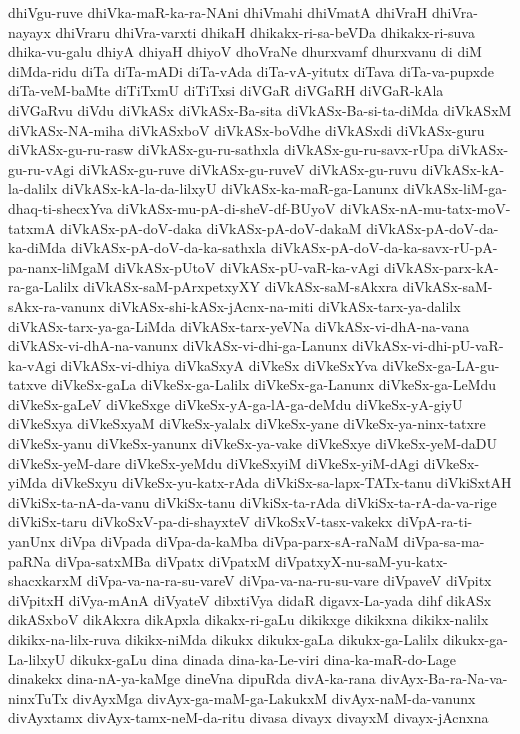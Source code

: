 {dhiVgu-ruve
dhiVka-maR-ka-ra-NAni
dhiVmahi
dhiVmatA
dhiVraH
dhiVra-nayayx
dhiVraru
dhiVra-varxti
dhikaH
dhikakx-ri-sa-beVDa
dhikakx-ri-suva
dhika-vu-galu
dhiyA
dhiyaH
dhiyoV
dhoVraNe
dhurxvamf
dhurxvanu
di
diM
diMda-ridu
diTa
diTa-mADi
diTa-vAda
diTa-vA-yitutx
diTava
diTa-va-pupxde
diTa-veM-baMte
diTiTxmU
diTiTxsi
diVGaR
diVGaRH
diVGaR-kAla
diVGaRvu
diVdu
diVkASx
diVkASx-Ba-sita
diVkASx-Ba-si-ta-diMda
diVkASxM
diVkASx-NA-miha
diVkASxboV
diVkASx-boVdhe
diVkASxdi
diVkASx-guru
diVkASx-gu-ru-rasw
diVkASx-gu-ru-sathxla
diVkASx-gu-ru-savx-rUpa
diVkASx-gu-ru-vAgi
diVkASx-gu-ruve
diVkASx-gu-ruveV
diVkASx-gu-ruvu
diVkASx-kA-la-dalilx
diVkASx-kA-la-da-lilxyU
diVkASx-ka-maR-ga-Lanunx
diVkASx-liM-ga-dhaq-ti-shecxYva
diVkASx-mu-pA-di-sheV-df-BUyoV
diVkASx-nA-mu-tatx-moV-tatxmA
diVkASx-pA-doV-daka
diVkASx-pA-doV-dakaM
diVkASx-pA-doV-da-ka-diMda
diVkASx-pA-doV-da-ka-sathxla
diVkASx-pA-doV-da-ka-savx-rU-pA-pa-nanx-liMgaM
diVkASx-pUtoV
diVkASx-pU-vaR-ka-vAgi
diVkASx-parx-kA-ra-ga-Lalilx
diVkASx-saM-pArxpetxyXY
diVkASx-saM-sAkxra
diVkASx-saM-sAkx-ra-vanunx
diVkASx-shi-kASx-jAcnx-na-miti
diVkASx-tarx-ya-dalilx
diVkASx-tarx-ya-ga-LiMda
diVkASx-tarx-yeVNa
diVkASx-vi-dhA-na-vana
diVkASx-vi-dhA-na-vanunx
diVkASx-vi-dhi-ga-Lanunx
diVkASx-vi-dhi-pU-vaR-ka-vAgi
diVkASx-vi-dhiya
diVkaSxyA
diVkeSx
diVkeSxYva
diVkeSx-ga-LA-gu-tatxve
diVkeSx-gaLa
diVkeSx-ga-Lalilx
diVkeSx-ga-Lanunx
diVkeSx-ga-LeMdu
diVkeSx-gaLeV
diVkeSxge
diVkeSx-yA-ga-lA-ga-deMdu
diVkeSx-yA-giyU
diVkeSxya
diVkeSxyaM
diVkeSx-yalalx
diVkeSx-yane
diVkeSx-ya-ninx-tatxre
diVkeSx-yanu
diVkeSx-yanunx
diVkeSx-ya-vake
diVkeSxye
diVkeSx-yeM-daDU
diVkeSx-yeM-dare
diVkeSx-yeMdu
diVkeSxyiM
diVkeSx-yiM-dAgi
diVkeSx-yiMda
diVkeSxyu
diVkeSx-yu-katx-rAda
diVkiSx-sa-lapx-TATx-tanu
diVkiSxtAH
diVkiSx-ta-nA-da-vanu
diVkiSx-tanu
diVkiSx-ta-rAda
diVkiSx-ta-rA-da-va-rige
diVkiSx-taru
diVkoSxV-pa-di-shayxteV
diVkoSxV-tasx-vakekx
diVpA-ra-ti-yanUnx
diVpa
diVpada
diVpa-da-kaMba
diVpa-parx-sA-raNaM
diVpa-sa-ma-paRNa
diVpa-satxMBa
diVpatx
diVpatxM
diVpatxyX-nu-saM-yu-katx-shacxkarxM
diVpa-va-na-ra-su-vareV
diVpa-va-na-ru-su-vare
diVpaveV
diVpitx
diVpitxH
diVya-mAnA
diVyateV
dibxtiVya
didaR
digavx-La-yada
dihf
dikASx
dikASxboV
dikAkxra
dikApxla
dikakx-ri-gaLu
dikikxge
dikikxna
dikikx-nalilx
dikikx-na-lilx-ruva
dikikx-niMda
dikukx
dikukx-gaLa
dikukx-ga-Lalilx
dikukx-ga-La-lilxyU
dikukx-gaLu
dina
dinada
dina-ka-Le-viri
dina-ka-maR-do-Lage
dinakekx
dina-nA-ya-kaMge
dineVna
dipuRda
divA-ka-rana
divAyx-Ba-ra-Na-va-ninxTuTx
divAyxMga
divAyx-ga-maM-ga-LakukxM
divAyx-naM-da-vanunx
divAyxtamx
divAyx-tamx-neM-da-ritu
divasa
divayx
divayxM
divayx-jAcnxna
}
